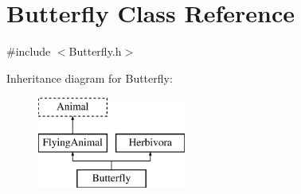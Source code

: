 \hypertarget{classButterfly}{\section{Butterfly Class Reference}
\label{classButterfly}
}


{\ttfamily \#include $<$Butterfly.\-h$>$}

Inheritance diagram for Butterfly\-:\begin{figure}[H]
\begin{center}
\leavevmode
\includegraphics[height=3.000000cm]{classButterfly}
\end{center}
\end{figure}

